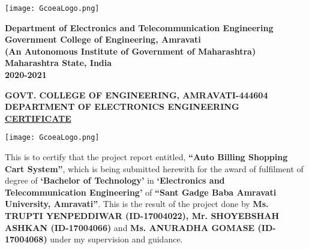 \documentclass[12pt]{article}
\begin{document}
\begin{center}
\vspace{3mm}
\texttt{[image: GcoeaLogo.png]}
\end{center}
\vspace{3mm}
\begin{center}
\textbf{\large{Department of Electronics and Telecommunication Engineering}}\\

\textbf{\large{Government College of Engineering,
Amravati}}
 \\

\textbf{\small{(An Autonomous Institute of Government of Maharashtra)}}\\

\textbf{\large{Maharashtra State, India}}\\

\textbf{\large{2020-2021}}
\end{center}
\newpage
{}
\begin{center}
\textbf{\large{GOVT. COLLEGE OF ENGINEERING, AMRAVATI-444604}}\\\textbf{\large{DEPARTMENT OF ELECTRONICS ENGINEERING}}\\
\textbf{\underline{\large{CERTIFICATE}}}
\end{center}
\begin{center}
\vspace{5mm}
\texttt{[image: GcoeaLogo.png]}
\end{center}
\hspace*{1 cm}This is to certify that the project report entitled, \textbf{“Auto Billing Shopping Cart System”}, which is being submitted herewith for the award of fulfilment of degree of
\textbf{`Bachelor of Technology'} in \textbf{`Electronics and Telecommunication Engineering'} of \textbf{“Sant Gadge Baba Amravati University, Amravati”}. This is the result of the project done by \textbf{Ms. TRUPTI YENPEDDIWAR (ID-17004022), Mr. SHOYEBSHAH ASHKAN (ID-17004066)} and \textbf{Ms. ANURADHA GOMASE (ID-17004068)} under my supervision and guidance.\\
\end{document}
